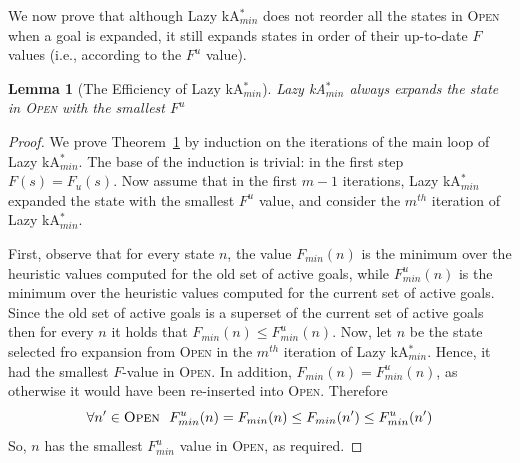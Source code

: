 \documentclass{aicom2e}
\newtheorem{lemma}{Lemma}
\newcommand{\kastarmin}{kA$^*_{min}$}
\newcommand{\open}{\textsc{Open}}
\begin{document}
We now prove that although Lazy \kastarmin{} does not reorder all the states in
\open{} when a goal is expanded, it still expands states in order of their
up-to-date $F$ values (i.e., according to the $F^u$ value).
\begin{lemma}[The Efficiency of Lazy \kastarmin{}]
Lazy \kastarmin{} always expands the state in \open{} with the smallest $F^u$
\label{the:lazy-minf-correct}
\end{lemma}
\begin{proof}


We prove Theorem~\ref{the:lazy-minf-correct} by induction on the iterations of
the main loop of Lazy \kastarmin{}.
The base of the induction is trivial: in the first step $F(s)=F_u(s)$. Now assume that in the first $m-1$ iterations, Lazy \kastarmin{} expanded the state with the smallest $F^u$ value, and consider the $m^{th}$ iteration of Lazy \kastarmin{}.


First, observe that for every state $n$, the value $F_{min}(n)$ is the minimum
over the heuristic values computed for the old set of active goals, while
$F_{min}^u(n)$ is the minimum over the heuristic values computed for the current
set of active goals. Since the old set of active goals is a superset of the
current set of active goals then for every $n$ it holds that $F_{min}(n)\leq
F^u_{min}(n)$.
Now, let $n$ be the state selected fro expansion from \open{} in the $m^{th}$
iteration of Lazy \kastarmin{}. Hence, it had the smallest $F$-value in
\open{}. In addition, $F_{min}(n)=F^u_{min}(n)$, as otherwise it would have
been re-inserted into \open{}. Therefore
\[ \forall n'\in\open{} ~~ F^u_{min}(n)=F_{min}(n)\leq F_{min}(n') \leq F^u_{min}(n') \]
    So, $n$ has the smallest $F^u_{min}$ value in \open{}, as required.
\end{proof}
\end{document}
